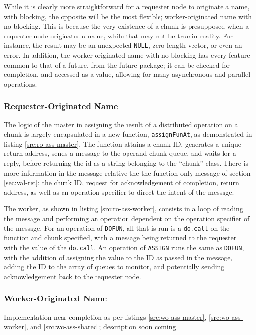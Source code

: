 \documentclass[a4paper,10pt]{article}
\begin{document}
While it is clearly more straightforward for a requester node to originate a
name, with blocking, the opposite will be the most flexible; worker-originated
name with no blocking.
This is because the very existence of a chunk is presupposed when a requester
node originates a name, while that may not be true in reality.
For instance, the result may be an unexpected \texttt{NULL}, zero-length
vector, or even an error.
In addition, the worker-originated name with no blocking has every feature
common to that of a future, from the future package; it can be checked for
completion, and accessed as a value, allowing for many asynchronous and
parallel operations.

\subsubsection{Requester-Originated Name}

The logic of the master in assigning the result of a distributed operation on a
chunk is largely encapsulated in a new function, \texttt{assignFunAt}, as
demonstrated in listing \ref{src:ro-ass-master}.
The function attains a chunk ID, generates a unique return address, sends a
message to the operand chunk queue, and waits for a reply, before returning the
id as a string belonging to the ``chunk'' class.
There is more information in the message relative the the function-only
message of section \ref{sec:val-ret}; the chunk ID, request for acknowledgement
of completion, return address, as well as an operation specifier to direct the
intent of the message.

The worker, as shown in listing \ref{src:ro-ass-worker}, consists in a loop of
reading the message and performing an operation dependent on the operation
specifier of the message.
For an operation of \texttt{DOFUN}, all that is run is a \texttt{do.call} on
the function and chunk specified, with a message being returned to the
requester with the value of the \texttt{do.call}.
An operation of \texttt{ASSIGN} runs the same as \texttt{DOFUN}, with the
addition of assigning the value to the ID as passed in the message, adding
the ID to the array of queues to monitor, and potentially sending
acknowledgement back to the requester node.

\subsubsection{Worker-Originated Name}

Implementation near-completion as per listings \ref{src:wo-ass-master},
\ref{src:wo-ass-worker}, and \ref{src:wo-ass-shared}; description soon coming
\end{document}
